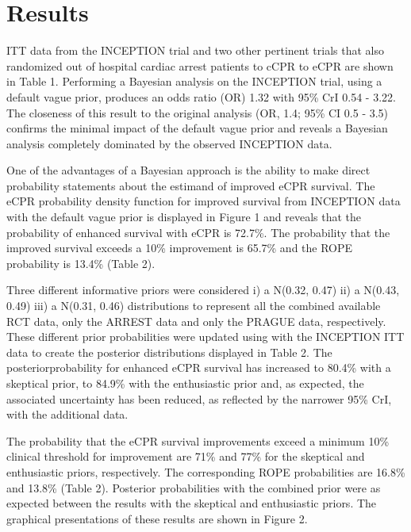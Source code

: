\documentclass[
  super,
  preprint,
  3p]{elsarticle}
\begin{document}
\hypertarget{results}{%
\section{Results}\label{results}}

ITT data from the INCEPTION trial\citep{CPR2023a} and two other
pertinent trials\citep{RN6759, RN6751} that also randomized out of
hospital cardiac arrest patients to cCPR to eCPR are shown in Table 1.
Performing a Bayesian analysis on the INCEPTION trial, using a default
vague prior, produces an odds ratio (OR) 1.32 with 95\% CrI 0.54 - 3.22.
The closeness of this result to the original analysis (OR, 1.4; 95\% CI
0.5 - 3.5) confirms the minimal impact of the default vague prior and
reveals a Bayesian analysis completely dominated by the observed
INCEPTION data.

One of the advantages of a Bayesian approach is the ability to make
direct probability statements about the estimand of improved eCPR
survival. The eCPR probability density function for improved survival
from INCEPTION data with the default vague prior is displayed in Figure
1 and reveals that the probability of enhanced survival with eCPR is
72.7\%. The probability that the improved survival exceeds a 10\%
improvement is 65.7\% and the ROPE probability is 13.4\% (Table 2).

Three different informative priors were considered i) a N(0.32, 0.47)
ii) a N(0.43, 0.49) iii) a N(0.31, 0.46) distributions to represent all
the combined available RCT data\citep{RN6759, RN6751}, only the
ARREST\citep{RN6751} data and only the PRAGUE\citep{RN6759} data,
respectively. These different prior probabilities were updated using
with the INCEPTION ITT data to create the posterior distributions
displayed in Table 2. The posteriorprobability for enhanced eCPR
survival has increased to 80.4\% with a skeptical prior, to 84.9\% with
the enthusiastic prior and, as expected, the associated uncertainty has
been reduced, as reflected by the narrower 95\% CrI, with the additional
data.

The probability that the eCPR survival improvements exceed a minimum
10\% clinical threshold for improvement are 71\% and 77\% for the
skeptical and enthusiastic priors, respectively. The corresponding ROPE
probabilities are 16.8\% and 13.8\% (Table 2). Posterior probabilities
with the combined prior were as expected between the results with the
skeptical and enthusiastic priors. The graphical presentations of these
results are shown in Figure 2.
\end{document}
